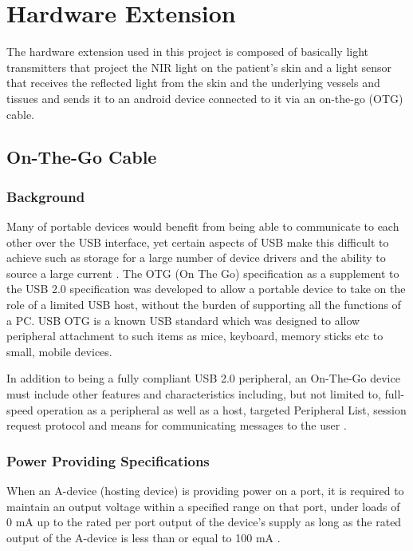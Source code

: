 
\chapter{Hardware Extension}\label{chapter:Hardware Extension}


The hardware extension used in this project is composed of basically light transmitters that project the NIR light on the patient’s skin and a light sensor that receives the reflected light from the skin and the underlying vessels and tissues and sends it to an android device connected to it via an on-the-go (OTG) cable.

\section{On-The-Go Cable}
\subsection{Background}
Many of portable devices would benefit from being able to communicate to each other over the USB interface, yet certain aspects of USB make this difficult to achieve such as storage for a large number of device drivers and the ability to source a large current \parencite{otg}.
The OTG (On The Go) specification as a supplement to the USB 2.0 specification was developed to allow a portable device to take on the role of a limited USB host, without the burden of supporting all the functions of a PC.
USB OTG is a known USB standard which was designed to allow peripheral attachment to such items as mice, keyboard, memory sticks etc to small, mobile devices.

In addition to being a fully compliant USB 2.0 peripheral, an On-The-Go device must include other features and characteristics including, but not limited to, full-speed operation as a peripheral as well as a host, targeted Peripheral List, session request protocol and means for communicating messages to the user \parencite{otg}.

\subsection{Power Providing Specifications}
When an A-device (hosting device) is providing power on a port, it is required to maintain an output voltage within a specified range on that port, under loads of 0 mA up to the rated per port output of the device’s supply as long as the rated output of the A-device is less than or equal to 100 mA \parencite{otg}.

